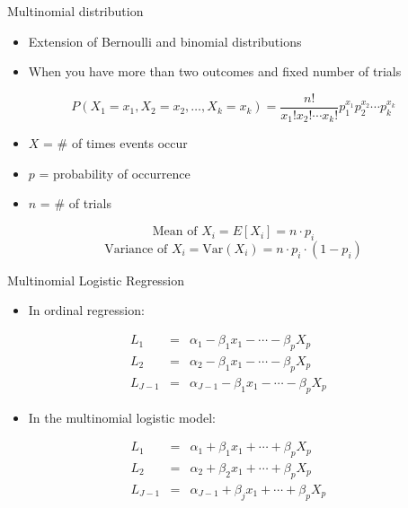 \documentclass[
  ignorenonframetext,
]{beamer}
\providecommand{\tightlist}{%
  \setlength{\itemsep}{0pt}\setlength{\parskip}{0pt}}
\begin{document}
\begin{frame}{Multinomial distribution}
\label{multinomial-distribution}
\begin{itemize}
\item
  Extension of Bernoulli and binomial distributions
\item
  When you have more than two outcomes and fixed number of trials
\end{itemize}

\[P(X_1 = x_1, X_2 = x_2, \ldots, X_k = x_k) = \frac{n!}{x_1! x_2! \cdots x_k!} p_1^{x_1} p_2^{x_2} \cdots p_k^{x_k}\]

\begin{itemize}
\tightlist
\item
  \(X\) = \# of times events occur
\item
  \(p\) = probability of occurrence
\item
  \(n\) = \# of trials
\end{itemize}

\[\text{Mean of } X_i = E[X_i] = n \cdot p_i\]\[\text{Variance of } X_i = \text{Var}(X_i) = n \cdot p_i \cdot (1 - p_i)\]
\end{frame}

\begin{frame}{Multinomial Logistic Regression}
\label{multinomial-logistic-regression-1}
\begin{itemize}
\tightlist
\item
  In ordinal regression:
\end{itemize}

\[\begin{array}{rcl} L_1 &=& \alpha_1-\beta_1x_1-\cdots-\beta_p X_p\\ L_2 &=& \alpha_2-\beta_1x_1-\cdots-\beta_p X_p & \\ L_{J-1} &=& \alpha_{J-1}-\beta_1x_1-\cdots-\beta_p X_p \end{array}\]

\begin{itemize}
\tightlist
\item
  In the multinomial logistic model:
\end{itemize}

\[\begin{array}{rcl} L_1 &=& \alpha_1+\beta_1x_1+\cdots+\beta_p X_p\\ L_2 &=& \alpha_2+\beta_2x_1+\cdots+\beta_p X_p & \\ L_{J-1} &=& \alpha_{J-1}+\beta_jx_1+\cdots+\beta_p X_p \end{array}\]
\end{frame}
\end{document}
